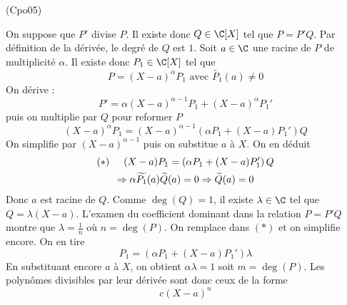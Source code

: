 \begin{tiny}(Cpo05)\end{tiny} On suppose que $P'$ divise $P$. Il existe donc $Q\in \C[X]$ tel que $P=P'Q$. Par définition de la dérivée, le degré de $Q$ est $1$.\newline
Soit $a\in \C$ une racine de $P$ de multiplicité $\alpha$. Il existe donc $P_1\in \C[X]$ tel que 
\begin{displaymath}
 P=(X-a)^\alpha P_1\text{ avec }\widetilde{P_1}(a)\neq 0
\end{displaymath}
On dérive :
\begin{displaymath}
 P' = \alpha(X-a)^{\alpha -1}P_1 +(X-a)^\alpha P_1'
\end{displaymath}
puis on multiplie par $Q$ pour reformer $P$
\begin{displaymath}
 (X-a)^\alpha P_1= (X-a)^{\alpha -1}\left(\alpha P_1 +(X-a)P_1'\right) Q 
\end{displaymath}
On simplifie par $(X-a)^{\alpha-1}$ puis on substitue $a$ à $X$. On en déduit
\begin{multline*}
 (*)\hspace{0.5cm} (X-a) P_1=\left(\alpha P_1 +(X-a)P_1'\right) Q \\
\Rightarrow \alpha \widetilde{P_1}(a)\widetilde{Q}(a)=0 \Rightarrow \widetilde{Q}(a)=0
\end{multline*}
Donc $a$ est racine de $Q$. Comme $\deg(Q)=1$, il existe $\lambda\in \C$ tel que $Q=\lambda(X-a)$. L'examen du coefficient dominant dans la relation $P=P'Q$ montre que $\lambda = \frac{1}{n}$ où $n=\deg(P)$. On remplace dans $(*)$ et on simplifie encore. On en tire
\begin{displaymath}
 P_1 = \left( \alpha P_1 +(X-a)P_1'\right)\lambda
\end{displaymath}
En substituant encore $a$ à $X$, on obtient $\alpha \lambda=1$ soit $m=\deg(P)$. Les polynômes divisibles par leur dérivée sont donc ceux de la forme
\begin{displaymath}
 c(X-a)^n
\end{displaymath}
